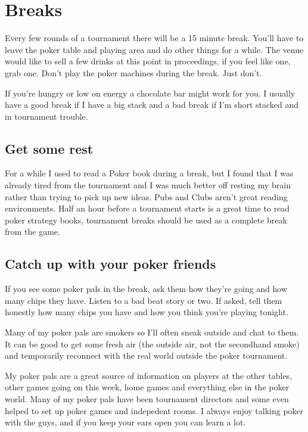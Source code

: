 \chapter{Breaks}


Every few rounds of a tournament there will be a 15 minute break.
You'll have to leave the poker table and playing area
and do other things for a while. The venue would like to sell
a few drinks at this point in proceedings, if you feel like one, grab one.
Don't play the poker machines during the break. Just don't.

If you're hungry or low on energy a chocolate bar might work
for you. I usually have a good break if I have a big stack
and a bad break if I'm short stacked and in tournament trouble.

\section*{Get some rest}

For a while I used to read a Poker book during a break, but I
found that I was already tired from the tournament and I was much better
off resting my brain rather than trying to pick up new ideas.
Pubs and Clubs aren't great reading environments. Half an hour before a
tournament starts is a great time to read poker strategy books,
tournament breaks should be used as a complete break from the game.

\section*{Catch up with your poker friends}

If you see some poker pals in the break, ask them how they're
going and how many chips they have. Listen to a bad beat story
or two. If asked, tell them honestly how
many chips you have and how you think you're playing tonight.

Many of my poker pals are smokers so I'll often sneak outside and
chat to them. It can be good to get some fresh air (the outside
air, not the secondhand smoke) and temporarily reconnect with
the real world outside the poker tournament.

My poker pals are a great source of information on players
at the other tables, other games going on this week, home games
and everything else in the poker world. Many of my poker pals
have been tournament directors and some even helped to set up
poker games and indepedent rooms. I always
enjoy talking poker with the guys, and if you keep your ears open
you can learn a lot.

